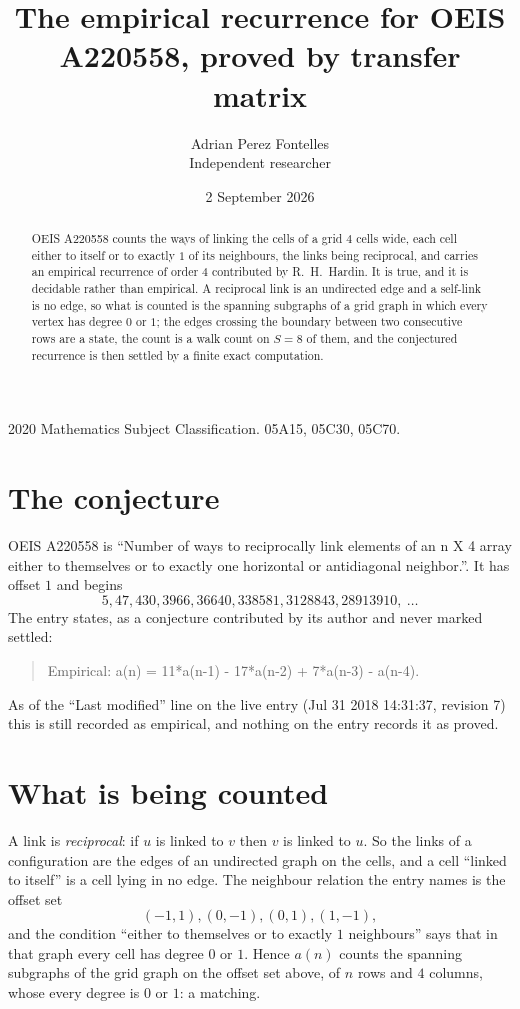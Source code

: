 \documentclass[11pt,a4paper]{article}
\title{The empirical recurrence for OEIS A220558, proved by transfer matrix}
\author{Adrian Perez Fontelles\\ \small Independent researcher}
\date{2 September 2026}
\theoremstyle{plain}
\theoremstyle{definition}
\begin{document}
\maketitle

\begin{abstract}
OEIS A220558 counts the ways of linking the cells of a grid $4$ cells wide, each cell either to
itself or to exactly $1$ of its neighbours, the links being reciprocal, and carries an
empirical recurrence of order $4$ contributed by R.~H.~Hardin. It is true, and it is
decidable rather than empirical. A reciprocal link is an undirected edge and a self-link is
no edge, so what is counted is the spanning subgraphs of a grid graph in which every vertex
has degree $0$ or $1$; the edges crossing the boundary between two consecutive rows are a
state, the count is a walk count on $S=8$ of them, and the conjectured recurrence is then
settled by a finite exact computation.
\end{abstract}

\noindent\small 2020 Mathematics Subject Classification. 05A15, 05C30, 05C70.\normalsize

\section{The conjecture}

OEIS A220558 is ``Number of ways to reciprocally link elements of an n X 4 array either to themselves or to exactly one horizontal or antidiagonal neighbor.''. It has offset $1$ and begins
\[
5, 47, 430, 3966, 36640, 338581, 3128843, 28913910,\ \dots
\]
The entry states, as a conjecture contributed by its author and never marked settled:
\begin{quote}
Empirical: a(n) = 11*a(n-1) - 17*a(n-2) + 7*a(n-3) - a(n-4).
\end{quote}
As of the ``Last modified'' line on the live entry (Jul 31 2018 14:31:37, revision 7) this is still
recorded as empirical, and nothing on the entry records it as proved.

\section{What is being counted}

A link is \emph{reciprocal}: if $u$ is linked to $v$ then $v$ is linked to $u$. So the links
of a configuration are the edges of an undirected graph on the cells, and a cell ``linked to
itself'' is a cell lying in no edge. The neighbour relation the entry names is the offset set
\[
(-1,1), (0,-1), (0,1), (1,-1),
\]
and the condition ``either to themselves or to exactly $1$ neighbours'' says that in that
graph every cell has degree $0$ or $1$. Hence $a(n)$ counts the spanning subgraphs of the
grid graph on the offset set above, of $n$ rows and $4$ columns,
whose every degree is $0$ or $1$: a matching.
\end{document}
